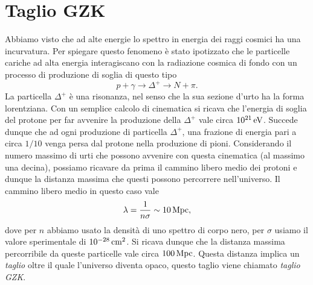 \section{Taglio GZK}

Abbiamo visto che ad alte energie lo spettro in energia dei raggi cosmici ha una incurvatura. Per spiegare questo fenomeno è stato ipotizzato che le particelle cariche ad alta energia interagiscano con la radiazione cosmica di fondo con un processo di produzione di soglia di questo tipo
\begin{equation*}
    p + \gamma \rightarrow \Delta^+ \rightarrow N + \pi.
\end{equation*}
La particella $\Delta^+$ è una risonanza, nel senso che la sua sezione d'urto ha la forma lorentziana. Con un semplice calcolo di cinematica si ricava che l'energia di soglia del protone per far avvenire la produzione della $\Delta^+$ vale circa $10^{21}\,\textup{eV}$. Succede dunque che ad ogni produzione di particella $\Delta^+$, una frazione di energia pari a circa $1/10$ venga persa dal protone nella produzione di pioni. Considerando il numero massimo di urti che possono avvenire con questa cinematica (al massimo una decina), possiamo ricavare da prima il cammino libero medio dei protoni e dunque la distanza massima che questi possono percorrere nell'universo. Il cammino libero medio in questo caso vale
\begin{equation*}
    \lambda = \frac{1}{n\sigma} \sim 10 \,\textup{Mpc},
\end{equation*}
dove per $n$ abbiamo usato la densità di uno spettro di corpo nero, per $\sigma$ usiamo il valore sperimentale di $10^{-28} \,\textup{cm}^2$. Si ricava dunque che la distanza massima percorribile da queste particelle vale circa $100\,\textup{Mpc}$. Questa distanza implica un \emph{taglio} oltre il quale l'universo diventa opaco, questo taglio viene chiamato \emph{taglio GZK}.